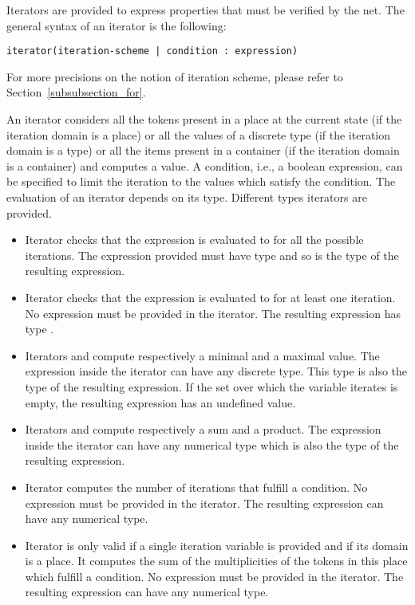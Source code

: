 \attributedef


Iterators are provided to express properties that must be verified by
the net.
The general syntax of an iterator is the following:
\begin{lstlisting}
iterator(iteration-scheme | condition : expression)
\end{lstlisting}
For more precisions on the notion of iteration scheme, please refer to
Section~\ref{subsubsection_for}.

An iterator considers all the tokens present in a place at the current
state (if the iteration domain is a place) or all the values of a
discrete type (if the iteration domain is a type) or all the items
present in a container (if the iteration domain is a container) and
computes a value.  A condition, i.e., a boolean expression, can be
specified to limit the iteration to the values which satisfy the
condition.  The evaluation of an iterator depends on its type.
Different types iterators are provided.
\begin{itemize}
\item Iterator  checks that the expression is evaluated to
   for all the possible iterations.  The expression provided
  must have type  and so is the type of the resulting
  expression.
\item Iterator  checks that the expression is evaluated to
   for at least one iteration.  No expression must be
  provided in the iterator.  The resulting expression has type
  .
\item Iterators  and  compute respectively a minimal
  and a maximal value.  The expression inside the iterator can have
  any discrete type.  This type is also the type of the resulting
  expression.  If the set over which the variable iterates is empty,
  the resulting expression has an undefined value.
\item Iterators  and  compute respectively a sum
  and a product.  The expression inside the iterator can have any
  numerical type which is also the type of the resulting expression.
\item Iterator  computes the number of iterations that
  fulfill a condition.  No expression must be provided in the
  iterator.  The resulting expression can have any numerical type.
\item Iterator  is only valid if a single iteration variable
  is provided and if its domain is a place.  It computes the sum of
  the multiplicities of the tokens in this place which fulfill a
  condition.  No expression must be provided in the iterator.  The
  resulting expression can have any numerical type.
\end{itemize}

